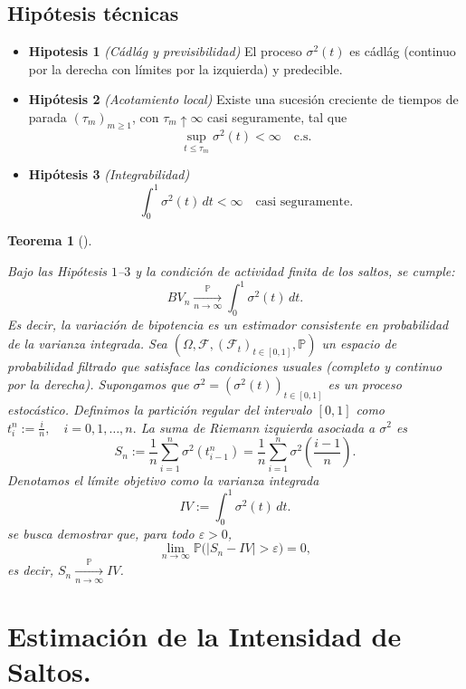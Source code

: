 \documentclass[
  spanish,
  us-letterpaper,
]{scrreprt}
\theoremstyle{plain}
\newtheorem{theorem}{Teorema}[chapter]
\theoremstyle{plain}
\theoremstyle{definition}
\theoremstyle{remark}
\begin{document}
\subsection{Hipótesis técnicas}\label{hipuxf3tesis-tuxe9cnicas}

\begin{itemize}
\item
  \textbf{Hipotesis 1} \emph{(Cádlág y previsibilidad)} El proceso
  \(\sigma^2(t)\) es cádlág (continuo por la derecha con límites por la
  izquierda) y predecible.
\item
  \textbf{Hipótesis 2} \emph{(Acotamiento local)} Existe una sucesión
  creciente de tiempos de parada \((\tau_m)_{m \geq 1}\), con
  \(\tau_m \uparrow \infty\) casi seguramente, tal que
  \[\sup_{t \leq \tau_m} \sigma^2(t) < \infty \quad \text{c.s.}\]
\item
  \textbf{Hipótesis 3} \emph{(Integrabilidad)}
  \[\int_0^1 \sigma^2(t)\,dt < \infty \quad \text{casi seguramente}.\]
\end{itemize}

\begin{theorem}[]\protect\hypertarget{thm-Cons_variacion_bipotencia}{}\label{thm-Cons_variacion_bipotencia}

Bajo las Hipótesis \(1\)--\(3\) y la condición de actividad finita de
los saltos, se cumple:
\[BV_n \xrightarrow[n\to\infty]{\mathbb{P}} \int_0^1 \sigma^2(t)\,dt.\]
Es decir, la variación de bipotencia es un estimador consistente en
probabilidad de la varianza integrada. Sea
\((\Omega, \mathcal{F}, (\mathcal{F}_t)_{t \in [0,1]}, \mathbb{P})\) un
espacio de probabilidad filtrado que satisface las
\textit{condiciones usuales} (completo y continuo por la derecha).
Supongamos que \(\sigma^2 = (\sigma^2(t))_{t \in [0,1]}\) es un proceso
estocástico. Definimos la partición regular del intervalo \([0,1]\) como
\(t_i^n := \frac{i}{n}, \quad i = 0,1,\dots,n.\) La suma de Riemann
izquierda asociada a \(\sigma^2\) es
\[S_n := \frac{1}{n} \sum_{i=1}^n \sigma^2\!\left(t_{i-1}^n\right) = \frac{1}{n} \sum_{i=1}^n \sigma^2\!\left(\frac{i-1}{n}\right).\]
Denotamos el límite objetivo como la varianza integrada
\[IV := \int_0^1 \sigma^2(t)\,dt.\] se busca demostrar que, para todo
\(\varepsilon > 0\),
\[\lim_{n \to \infty} \mathbb{P}\bigl( |S_n - IV| > \varepsilon \bigr) = 0,\]
es decir, \(S_n \xrightarrow[n \to \infty]{\mathbb{P}} IV\).

\end{theorem}

\section{Estimación de la Intensidad de
Saltos.}\label{estimaciuxf3n-de-la-intensidad-de-saltos.}
\end{document}
